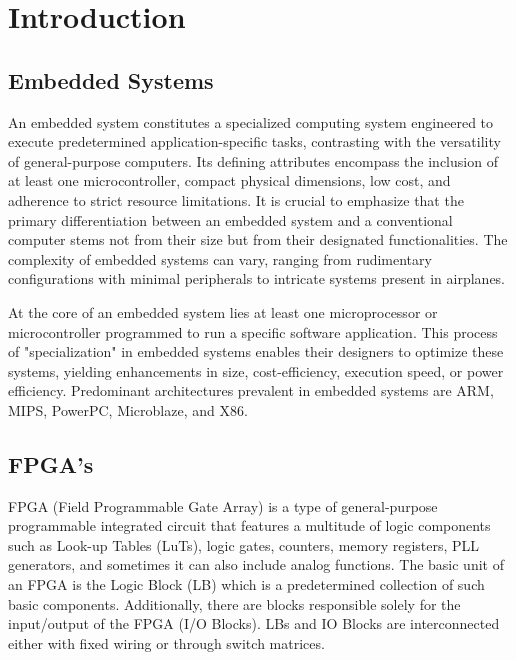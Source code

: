 
\chapter{Introduction}



\section{Embedded Systems}

An embedded system constitutes a specialized computing system engineered to execute predetermined application-specific tasks, contrasting with the versatility of general-purpose computers. Its defining attributes encompass the inclusion of at least one microcontroller, compact physical dimensions, low cost, and adherence to strict resource limitations. It is crucial to emphasize that the primary differentiation between an embedded system and a conventional computer stems not from their size but from their designated functionalities. The complexity of embedded systems can vary, ranging from rudimentary configurations with minimal peripherals to intricate systems present in airplanes.

At the core of an embedded system lies at least one microprocessor or microcontroller programmed to run a specific software application. This process of "specialization" in embedded systems enables their designers to optimize these systems, yielding enhancements in size, cost-efficiency, execution speed, or power efficiency.  Predominant architectures prevalent in embedded systems are ARM, MIPS, PowerPC, Microblaze, and X86.




\section{FPGA's}
FPGA (Field Programmable Gate Array) is a type of general-purpose programmable integrated circuit that features a multitude of logic components such as Look-up Tables (LuTs), logic gates, counters, memory registers, PLL generators, and sometimes it can also include analog functions. The basic unit of an FPGA is the Logic Block (LB) which is a predetermined collection of such basic components. Additionally, there are blocks responsible solely for the input/output of the FPGA (I/O Blocks). LBs and IO Blocks are interconnected either with fixed wiring or through switch matrices.

